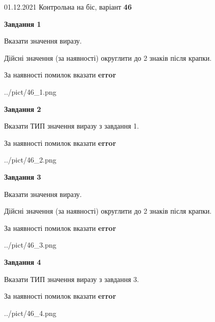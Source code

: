\documentclass[11pt, ukrainian]{article}
\begin{document}
{01.12.2021 Контрольна на біс, варіант  \No \textbf { 46 }\par}
{
\begin {large}
{\begin {center}\textbf{Завдання 1}\end {center}}\par
Вказати значення виразу. \par
Дійсні значення (за наявності) округлити до 2 знаків після крапки. \par
За наявності помилок вказати \textbf{error}

\begin{center}
	{../pict/46_1.png}
\end{center}
\newpage

{\begin {center}\textbf{Завдання 2}\end {center}}\par
Вказати ТИП значення виразу з завдання 1. \par
За наявності помилок вказати \textbf{error}

\begin{center}
	{../pict/46_2.png}
\end{center}
\newpage

{\begin {center}\textbf{Завдання 3}\end {center}}\par
Вказати значення виразу. \par
Дійсні значення (за наявності) округлити до 2 знаків після крапки. \par
За наявності помилок вказати \textbf{error}

\begin{center}
	{../pict/46_3.png}
\end{center}
\newpage

{\begin {center}\textbf{Завдання 4}\end {center}}\par
Вказати ТИП значення виразу з завдання 3. \par
За наявності помилок вказати \textbf{error}

\begin{center}
	{../pict/46_4.png}
\end{center}
\newpage


\end{large}}
\end{document}
